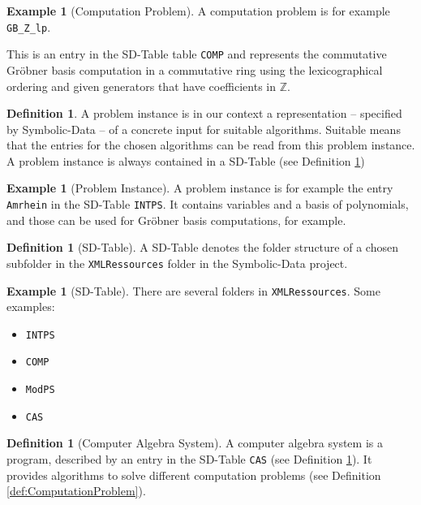 \documentclass[11pt,a4paper]{amsart}
\numberwithin{equation}{section}
\theoremstyle{definition}
\newtheorem{definition}[theorem]{Definition}
\newtheorem{example}[theorem]{Example}
\newcommand{\ZZ}{{\mathbb{Z}}}
\begin{document}
\begin{example}[Computation Problem]
 A computation
problem is for example \texttt{GB\_Z\_lp}.

This is an entry in the SD-Table
table \texttt{COMP} and represents the commutative Gr\"obner basis
computation in a commutative ring using the lexicographical ordering
and given generators that have coefficients in $\ZZ$.
\end{example}

\begin{definition}
\label{def:ProblemInstance}
A problem instance is in our context a representation -- specified by
Symbolic-Data -- of a concrete input for suitable algorithms. Suitable
means that the entries for the chosen algorithms can be read from this
problem instance. A problem instance is always contained in a SD-Table
(see Definition \ref{def:SD-Table})
\end{definition}

\begin{example}[Problem Instance]
  A problem instance is for example the entry \texttt{Amrhein} in the
  SD-Table \texttt{INTPS}. It contains variables and a basis of
  polynomials, and those can be used for Gr\"obner basis computations,
  for example.
\end{example}

\begin{definition}[SD-Table]
\label{def:SD-Table}
A SD-Table denotes the folder structure of a chosen subfolder in the
\texttt{XMLRessources} folder in the Symbolic-Data project.
\end{definition}

\begin{example}[SD-Table]
There are several folders in \texttt{XMLRessources}. Some examples:
\begin{itemize}
   \item \texttt{INTPS}
   \item \texttt{COMP}
   \item \texttt{ModPS}
   \item \texttt{CAS}
\end{itemize}
\end{example}

\begin{definition}[Computer Algebra System]
\label{def:computeralgebrasystem}
  A computer algebra system is a program, described by an entry in the
  SD-Table \texttt{CAS} (see Definition \ref{def:SD-Table}). It
  provides algorithms to solve different computation problems (see
  Definition \ref{def:ComputationProblem}).
\end{definition}
\end{document}
